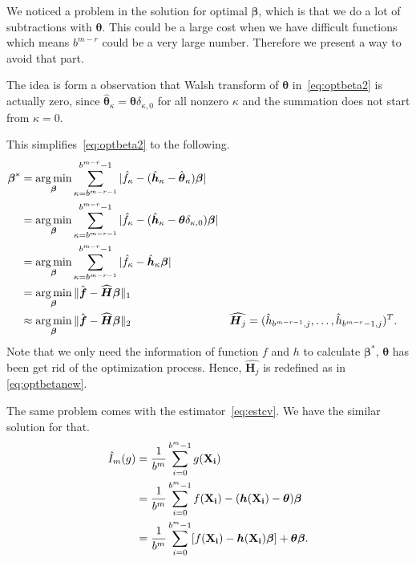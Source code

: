 
We noticed a problem in the solution for optimal $\boldsymbol{\beta}$, which is that we do a lot of subtractions with $\boldsymbol{\theta}$. 
This could be a large cost when we have difficult functions which means $b^{m-r}$ could be a very large number. Therefore we present a way to avoid that part.

The idea is form a observation that Walsh transform of $\boldsymbol{\theta}$ in~\eqref{eq:optbeta2} is actually zero, since $\hat{\boldsymbol{\theta}}_\kappa= \boldsymbol{\theta}\delta_{\kappa,0}$ for all nonzero $\kappa$ and the summation does not start from $\kappa=0$.

This simplifies~\eqref{eq:optbeta2} to the following. 
\begin{align}
    \boldsymbol{\beta}^*
    \notag
    &=\operatorname*{arg\,min}_{\boldsymbol{\beta}}\sum_{\kappa=b^{m-r-1}}^{b^{m-r}-1}|\hat{f}_\kappa
    -(\hat{\boldsymbol{h}}_\kappa - \hat{\boldsymbol{\theta}}_\kappa)\boldsymbol{\boldsymbol{\beta}}|\\
    &=\operatorname*{arg\,min}_{\boldsymbol{\beta}}\sum_{\kappa=b^{m-r-1}}^{b^{m-r}-1}|\hat{f}_\kappa
    -(\hat{\boldsymbol{h}}_\kappa - \boldsymbol{\theta}\delta_{\kappa,0})\boldsymbol{\boldsymbol{\beta}}| \notag \\
    &=\operatorname*{arg\,min}_{\boldsymbol{\beta}}\sum_{\kappa=b^{m-r-1}}^{b^{m-r}-1}|\hat{f}_\kappa
    -\hat{\boldsymbol{h}}_\kappa \boldsymbol{\boldsymbol{\beta}}|\notag\\
    &=\operatorname*{arg\,min}_{\boldsymbol{\beta}}\|\hat{\boldsymbol{f}}-\widehat{\boldsymbol{H}}\boldsymbol{\beta}\|_1\notag\\
    \label{eq:optbetanew}
    &\approx\operatorname*{arg\,min}_{\boldsymbol{\beta}}\|\hat{\boldsymbol{f}}-\widehat{\boldsymbol{H}}\boldsymbol{\beta}\|_2
    &&\widehat{\boldsymbol{H}_j}=(\hat{h}_{b^{m-r-1},j},\dots, \hat{h}_{b^{m-r}-1,j})^T.
\end{align}
Note that we only need the information of function $f$ and $h$ to calculate $\boldsymbol{\beta}^*$, $\boldsymbol{\theta}$ has been get rid of the optimization process. 
Hence, $\widehat{\boldsymbol{H}_j}$ is redefined as in \eqref{eq:optbetanew}. 

The same problem comes with the estimator~\eqref{eq:estcv}. We have the similar solution for that.
\begin{align}
    \notag
    \hat{I}_m({g})
    & = \frac{1}{b^m}\sum_{i=0}^{b^m-1}g(\mathbf{X_i})\\
    \notag
    & = \frac{1}{b^m}\sum_{i=0}^{b^m-1}f(\mathbf{X_i})-(\boldsymbol{h}(\mathbf{X_i})-\boldsymbol{\theta})\boldsymbol{\beta}\\
    \label{eq:estcvnew}
    & = \frac{1}{b^m}\sum_{i=0}^{b^m-1}[f(\mathbf{X_i})-\boldsymbol{h}(\mathbf{X_i})\boldsymbol{\beta}]+\boldsymbol{\theta}\boldsymbol{\beta}.
\end{align}

